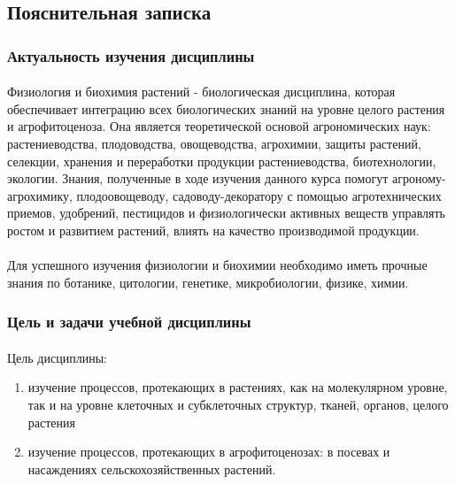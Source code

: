 \subsection{Пояснительная записка}

\subsubsection{Актуальность изучения дисциплины}
\paragraph*{}Физиология и биохимия растений - биологическая дисциплина, которая обеспечивает интеграцию всех биологических знаний на уровне целого растения и агрофитоценоза. Она является теоретической основой агрономических наук: растениеводства, плодоводства, овощеводства, агрохимии, защиты растений, селекции, хранения и переработки продукции растениеводства, биотехнологии, экологии. Знания, полученные в ходе изучения данного курса помогут агроному-агрохимику, плодоовощеводу, садоводу-декоратору с помощью агротехнических приемов, удобрений, пестицидов и физиологически активных веществ управлять ростом и развитием растений, влиять на качество производимой продукции.

\paragraph*{}Для успешного изучения физиологии и биохимии необходимо иметь прочные знания по ботанике, цитологии, генетике, микробиологии, физике, химии.

\subsubsection{Цель и задачи учебной дисциплины}

\paragraph*{}Цель дисциплины: 

\begin{enumerate}

\item изучение процессов, протекающих в растениях, как на молекулярном уровне, так и на уровне клеточных и субклеточных структур, тканей, органов, целого растения
\item изучение процессов, протекающих в агрофитоценозах: в посевах и насаждениях сельскохозяйственных растений. 

\end{enumerate}


